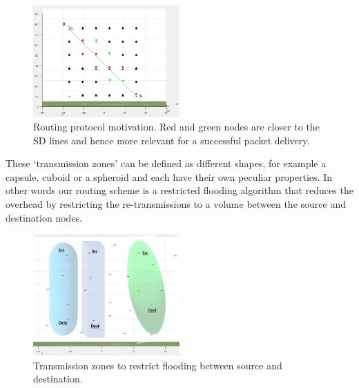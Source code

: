 \begin{figure}[hbtp]
\centering
\includegraphics[width=0.5\textwidth]{Chapter-3/figs/routing_motivation}
\caption{Routing protocol motivation. Red and green nodes are closer to the SD lines and hence more relevant for a successful packet delivery.}
\label{fig:routing_motivation}
\end{figure}
These `transmission zones' can be defined as different shapes, for example a capsule, cuboid or a spheroid  and each have their own peculiar properties. In other words our routing scheme is a restricted flooding algorithm that reduces the overhead by restricting the re-transmissions to a volume between the source and destination nodes. 

\begin{figure}[hbtp]
\centering
\includegraphics[width=0.5\textwidth]{Chapter-3/figs/Zone_examples}
\caption{Transmission zones to restrict flooding between source and destination.}
\label{fig:trans_zones_example}
\end{figure}

